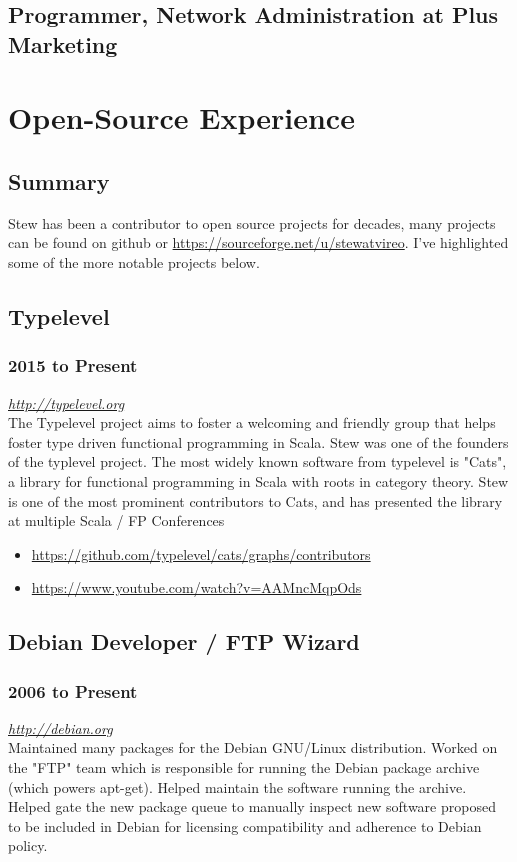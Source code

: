 \documentclass[letterpaper]{article}
\begin{document}
\subsection{Programmer, Network Administration at Plus Marketing}
\label{sec-2-11}

\section{Open-Source Experience}
\label{sec-3}
\subsection{Summary}
\label{sec-3-1}
Stew has been a contributor to open source projects for decades, many
projects can be found on github or
\url{https://sourceforge.net/u/stewatvireo}. I've highlighted some of the more
notable projects below.

\subsection{Typelevel}
\label{sec-3-2}
\subsubsection{2015 to Present}
\label{sec-3-2-1}
\emph{\url{http://typelevel.org}}\\

The Typelevel project aims to foster a welcoming and friendly group
that helps foster type driven functional programming in Scala. Stew
was one of the founders of the typlevel project. The most widely
known software from typelevel is "Cats", a library for functional
programming in Scala with roots in category theory. Stew is one of the
most prominent contributors to Cats, and has presented the library at
multiple Scala / FP Conferences

\begin{itemize}
\item \url{https://github.com/typelevel/cats/graphs/contributors}
\item \url{https://www.youtube.com/watch?v=AAMncMqpOds}
\end{itemize}


\subsection{Debian Developer / FTP Wizard}
\label{sec-3-3}
\subsubsection{2006 to Present}
\label{sec-3-3-1}
\emph{\url{http://debian.org}}\\
Maintained many packages for the Debian GNU/Linux distribution. Worked
on the "FTP" team which is responsible for running the Debian package
archive (which powers apt-get). Helped maintain the software running
the archive. Helped gate the new package queue to manually inspect new
software proposed to be included in Debian for licensing compatibility
and adherence to Debian policy.
\end{document}
